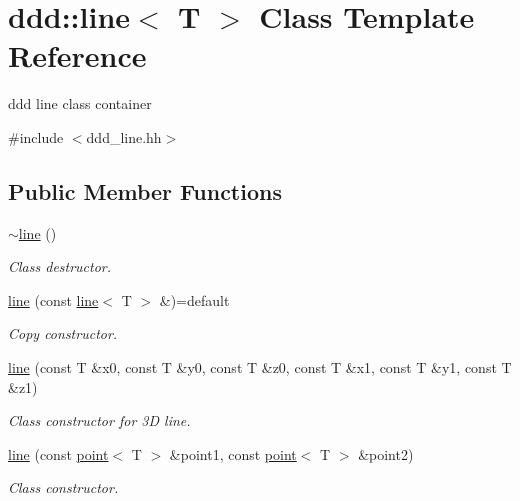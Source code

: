 \hypertarget{classddd_1_1line}{}\section{ddd\+:\+:line$<$ T $>$ Class Template Reference}
\label{classddd_1_1line}


ddd line class container  




{\ttfamily \#include $<$ddd\+\_\+line.\+hh$>$}

\subsection*{Public Member Functions}
\begin{DoxyCompactItemize}
\item 
\mbox{\label{classddd_1_1line_a456f8a87d73fbc2aaf27c502bec653e3}} 
\hyperlink{classddd_1_1line_a456f8a87d73fbc2aaf27c502bec653e3}{$\sim$line} ()
\begin{DoxyCompactList}\small\item\em Class destructor. \end{DoxyCompactList}\item 
\mbox{\label{classddd_1_1line_a0a87f672568157869bbf2aa6c4f78395}} 
\hyperlink{classddd_1_1line_a0a87f672568157869bbf2aa6c4f78395}{line} (const \hyperlink{classddd_1_1line}{line}$<$ T $>$ \&)=default
\begin{DoxyCompactList}\small\item\em Copy constructor. \end{DoxyCompactList}\item 
\mbox{\label{classddd_1_1line_aeed42ee3ff157ff44dd237943f515c0f}} 
\hyperlink{classddd_1_1line_aeed42ee3ff157ff44dd237943f515c0f}{line} (const T \&x0, const T \&y0, const T \&z0, const T \&x1, const T \&y1, const T \&z1)
\begin{DoxyCompactList}\small\item\em Class constructor for 3D line. \end{DoxyCompactList}\item 
\hyperlink{classddd_1_1line_a1b5a2bea42f89d3d77bde14f49f072d9}{line} (const \hyperlink{classddd_1_1point}{point}$<$ T $>$ \&point1, const \hyperlink{classddd_1_1point}{point}$<$ T $>$ \&point2)
\begin{DoxyCompactList}\small\item\em Class constructor. \end{DoxyCompactList}\item 

\end{DoxyCompactItemize}

